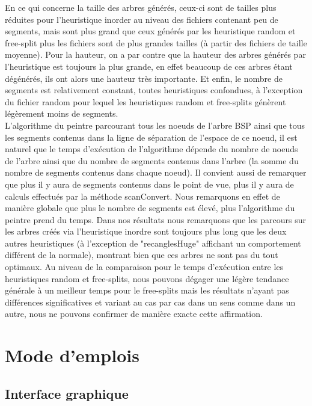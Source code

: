 \documentclass[11pt,a4paper]{article}
\theoremstyle{definition}
\theoremstyle{remark}
\begin{document}
En ce qui concerne la taille  des arbres générés, ceux-ci sont de tailles plus réduites pour l'heuristique inorder au niveau des fichiers contenant peu de segments, mais sont plus grand que ceux générés par les heuristique random et free-split plus les fichiers sont de plus grandes tailles (à partir des fichiers de taille moyenne). Pour la hauteur, on a par contre que la hauteur des arbres générés par l'heuristique est toujours la plus grande, en effet beaucoup de ces arbres étant dégénérés, ils ont alors une hauteur très importante. Et enfin, le nombre de segments est relativement constant, toutes heuristiques confondues, à l'exception du fichier random pour lequel les heuristiques random et free-splits génèrent légèrement moins de segments. \\

L'algorithme du peintre parcourant tous les noeuds de l'arbre BSP ainsi que tous les segments contenus dans la ligne de séparation de l'espace de ce noeud, il est naturel que le temps d'exécution de l'algorithme dépende du nombre de noeuds de l'arbre ainsi que du nombre de segments contenus dans l'arbre (la somme du nombre de segments contenus dans chaque noeud). Il convient aussi de remarquer que plus il y aura de segments contenus dans le point de vue, plus il y aura de calculs effectués par la méthode scanConvert. Nous remarquons en effet de manière globale que plus le nombre de segments est élevé, plus l'algorithme du peintre prend du temps. Dans nos résultats nous remarquons que les parcours sur les arbres créés via l'heuristique inordre sont toujours plus long que les deux autres heuristiques (à l'exception de "recanglesHuge" affichant un comportement différent de la normale), montrant bien que ces arbres ne sont pas du tout optimaux. Au niveau de la comparaison pour le temps d'exécution entre les heuristiques random et free-splits, nous pouvons dégager une légère tendance générale à un meilleur temps pour le free-splits mais les résultats n'ayant pas différences significatives et variant au cas par cas dans un sens comme dans un autre, nous ne pouvons confirmer de manière exacte cette affirmation.
\section{Mode d'emplois}

\subsection{Interface graphique}
\end{document}
